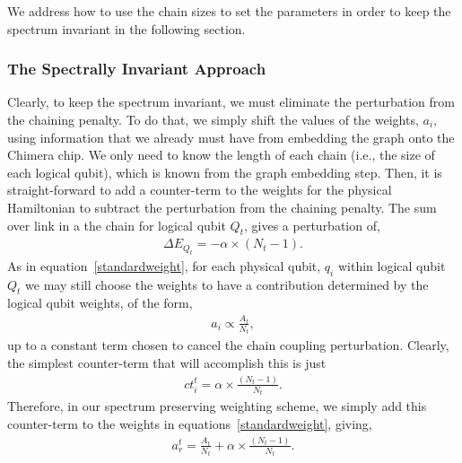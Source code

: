 \documentclass[preprint,12pt,eqsecnum,nofootinbib,amsmath,amssymb]{revtex4}
\begin{document}
We address how to use the chain sizes to set the parameters in order to keep the spectrum invariant 
in the following section.


\subsubsection{The Spectrally Invariant Approach}
Clearly, to keep the spectrum invariant, we must eliminate the perturbation from the
chaining penalty.
To do that, we simply shift the values of the weights, $a_i$, using information that we 
already must have from embedding the graph onto the Chimera chip. We only need to know
the length of each chain (i.e., the size of each logical qubit), which is known from 
the graph embedding step. Then, it is straight-forward to add a counter-term to the weights 
for the physical Hamiltonian to subtract the perturbation from the chaining penalty.
The sum over link in a the chain for logical qubit $Q_t$, gives a perturbation of,
%
\begin{eqnarray}
  \Delta E_{Q_t} = -\alpha \times (N_t-1). 
  \label{qperturbation}  
\end{eqnarray}
%
As in equation~\ref{standardweight}, for each physical qubit, $q_i$ within logical qubit $Q_t$ 
we may still choose the weights to have a contribution determined by the
logical qubit weights, of the form,
%
\begin{eqnarray}
  a_i \propto \frac{A_t}{N_t},
\end{eqnarray}
%
up to a constant term chosen to cancel the chain coupling perturbation.  Clearly, the
simplest counter-term that will accomplish this is just
%
\begin{eqnarray}
  ct_i^t = \alpha \times \frac{(N_t-1)}{N_t}.
\end{eqnarray}
%
Therefore, in our spectrum preserving weighting scheme, we simply add this counter-term to the weights 
in equations~\ref{standardweight}, giving,
%
\begin{eqnarray}
  a^t_r = \frac{A_t}{N_t} + \alpha \times \frac{(N_t-1)}{N_t}.
  \label{newwieght}
\end{eqnarray}
\pagebreak

\end{document}
